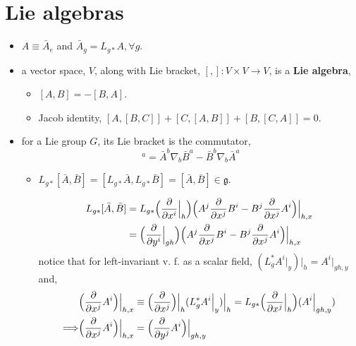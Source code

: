 \section{Lie algebras}
\begin{itemize}
	\item $A \equiv \bar{A}_e$ and $\bar{A}_g = L_{g *} A, \forall g$.
	
	\item a vector space, $V$, along with Lie bracket, $[,]: V \times V \rightarrow V$, is a \textbf{Lie algebra},
	\begin{itemize}
		\item $[A, B] = - [B, A]$.
		
		\item Jacob identity, $[A, [B, C]] + [C, [A, B]] + [B, [C, A]] = 0$.
	\end{itemize}
	
	\item for a Lie group $G$, its Lie bracket is the commutator,
	\begin{equation}
		[\bar{A}, \bar{B}]^a = \bar{A}^b \nabla_b \bar{B}^a - \bar{B}^b \nabla_b \bar{A}^a
	\end{equation}
	\begin{itemize}
		\item $L_{g *} [\bar{A}, \bar{B}] = [L_{g *} \bar{A}, L_{g *} \bar{B}] = [\bar{A}, \bar{B}] \in \mathfrak{g}$.
		
		\begin{tcolorbox}[title=proof:]
			\begin{align}
				L_{g *} [\bar{A}, \bar{B}] &= L_{g *} \Big( \frac{\partial}{\partial x^i} \Big|_h \Big) \Big( A^j \frac{\partial}{\partial x^j} B^i - B^j \frac{\partial}{\partial x^j} A^i \Big) \Big|_{h, x} \notag \\
				&= \Big( \frac{\partial}{\partial y^i} \Big|_{g h} \Big) \Big( A^j \frac{\partial}{\partial x^j} B^i - B^j \frac{\partial}{\partial x^j} A^i \Big) \Big|_{h, x}
			\end{align}
			notice that for left-invariant v. f. as a scalar field, $(L_g^* A^i \big|_y) \big|_h = A^i \big|_{g h, y}$ and,
			\begin{align}
				& \Big( \frac{\partial}{\partial x^j} A^i \Big) \Big|_{h, x} \equiv \Big( \frac{\partial}{\partial x^j} \Big) \Big|_h (L_g^* A^i \Big|_y) \Big|_h = L_{g *} \Big( \frac{\partial}{\partial x^j} \Big|_h \Big) (A^i \Big|_{g h, y}) \notag \\
				\Longrightarrow & \Big( \frac{\partial}{\partial x^j} A^i \Big) \Big|_{h, x} = \Big( \frac{\partial}{\partial y^j} A^i \Big) \Big|_{g h, y}
			\end{align}
			

\end{tcolorbox}
\end{itemize}
\end{itemize}
